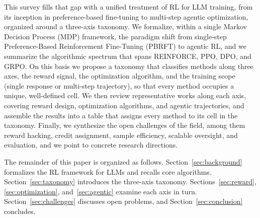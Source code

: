 This survey fills that gap with a unified treatment of RL for LLM
training, from its inception in preference-based fine-tuning to
multi-step agentic optimization, organized around a three-axis
taxonomy. We formalize, within a single Markov Decision Process (MDP)
framework, the paradigm shift from single-step Preference-Based
Reinforcement Fine-Tuning (PBRFT) to agentic RL,
and we summarize the algorithmic spectrum that spans REINFORCE, PPO,
DPO, and GRPO. On this basis we propose a taxonomy that classifies
methods along three axes, the reward signal, the
optimization algorithm, and the training scope (single response or
multi-step trajectory), so that every method occupies a unique,
well-defined cell. We then review representative works along each axis,
covering reward design, optimization algorithms, and agentic
trajectories, and assemble the results into a table that assigns every method to its cell in the taxonomy.
Finally, we synthesize the open challenges of the field, among them
reward hacking, credit assignment, sample efficiency, scalable
oversight, and evaluation, and we point to concrete research
directions.

The remainder of this paper is organized as follows.
Section~\ref{sec:background} formalizes the RL framework for LLMs and
recalls core algorithms. Section~\ref{sec:taxonomy} introduces the
three-axis taxonomy. Sections~\ref{sec:reward}, \ref{sec:optimization},
and~\ref{sec:agentic} examine each axis in turn.
Section~\ref{sec:challenges} discusses open problems, and
Section~\ref{sec:conclusion} concludes.
